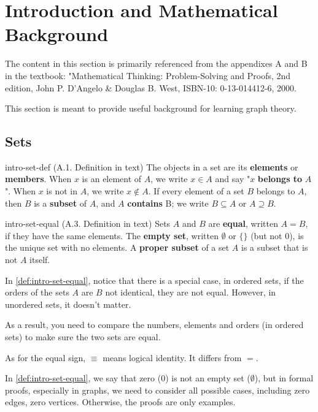 \documentclass[../src/handouts/main.tex]{subfiles}
\begin{document}
\section{Introduction and Mathematical Background}

The content in this section is primarily referenced from the appendixes A and B in the textbook: "Mathematical Thinking: Problem-Solving and Proofs, 2nd edition, John P. D'Angelo \& Douglas B. West, ISBN-10: 0-13-014412-6, 2000.

This section is meant to provide useful background for learning graph theory.

\subsection{Sets}

\begin{definition}{}{intro-set-def}
  (A.1. Definition in text)
  The objects in a set are its \textbf{elements} or \textbf{members}.
  When $x$ is an element of $A$, we write $x \in A$ and say "$x$ \textbf{belongs to} $A$".
  When $x$ is not in $A$, we write $x \notin A$.
  If every element of a set $B$ belongs to $A$, then $B$ is a \textbf{subset} of $A$, and $A$ \textbf{contains} B; we write $B \subseteq A$ or $A \supseteq B$.
\end{definition}

\begin{definition}{}{intro-set-equal}
  (A.3. Definition in text)
  Sets $A$ and $B$ are \textbf{equal}, written $A = B$, if they have the same elements. The \textbf{empty set}, written $\emptyset$ or $\lbrace \rbrace$ (but not 0), is the unique set with no elements. A \textbf{proper subset} of a set $A$ is a subset that is not $A$ itself.
\end{definition}

In \cref{def:intro-set-equal}, notice that there is a special case, in ordered sets, if the orders of the sets $A$ are $B$ not identical, they are not equal. However, in unordered sets, it doesn't matter.

As a result, you need to compare the numbers, elements and orders (in ordered sets) to make sure the two sets are equal.

As for the equal sign, $\equiv$ means logical identity. It differs from $=$.

In \cref{def:intro-set-equal}, we say that zero (0) is not an empty set ($\emptyset$), but in formal proofs, especially in graphs, we need to consider all possible cases, including zero edges, zero vertices. Otherwise, the proofs are only examples.
\end{document}
